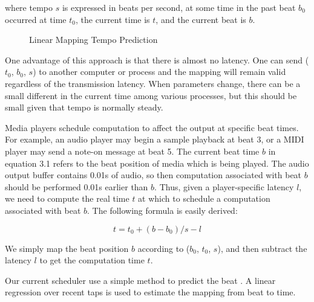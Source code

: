 where tempo $s$ is expressed in beats per second, at some time in the past beat $b_0$
occurred at time $t_0$, the current time is $t$, and the current beat is $b$.

\begin{figure}[H]
\caption{Linear Mapping Tempo Prediction \cite{Dawen:ISMIR2011}}
\end{figure}

One advantage of this approach is that there is almost no latency.
One can send ($t_0$, $b_0$, $s$) to another computer or process and the 
mapping will remain valid regardless of the transmission latency. 
When parameters change, there can be a small different in the current 
time among various processes, but this should be small given that tempo 
is normally steady.

Media players schedule computation to affect the output at specific beat
times. For example, an audio player may begin a sample playback at beat 3, or a
MIDI player may send a note-on message at beat 5. The current beat time $b$ in 
equation 3.1 refers to the beat position of media which is being played.
The audio output buffer contains 0.01s of audio, so then computation associated 
with beat $b$ should be performed 0.01s earlier than $b$. Thus, given a 
player-specific latency $l$, we need to compute the real time $t$ at which to 
schedule a computation associated
with beat $b$. The following formula is easily derived:

\begin{equation}
t = t_0 + (b - b_0) / s - l
\end{equation}

We simply map the beat position $b$ according to ($b_0$, $t_0$, $s$), and then subtract the
latency $l$ to get the computation time $t$.

Our current scheduler use a simple method to predict the beat . 
A linear regression over recent taps is used to estimate the
mapping from beat to time. 


